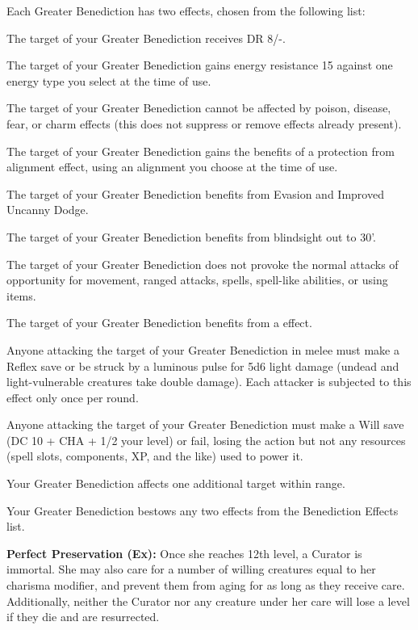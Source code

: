 Each Greater Benediction has two effects, chosen from the following list:
\begin{itemize*}
\item The target of your Greater Benediction receives DR 8/-.
\item The target of your Greater Benediction gains energy resistance 15 against one energy type you select at the time of use.
\item The target of your Greater Benediction cannot be affected by poison, disease, fear, or charm effects (this does not suppress or remove effects already present).
\item The target of your Greater Benediction gains the benefits of a protection from alignment effect, using an alignment you choose at the time of use.
\item The target of your Greater Benediction benefits from Evasion and Improved Uncanny Dodge.
\item The target of your Greater Benediction benefits from blindsight out to 30'.
\item The target of your Greater Benediction does not provoke the normal attacks of opportunity for movement, ranged attacks, spells, spell-like abilities, or using items.
\item The target of your Greater Benediction benefits from a  effect.
\item Anyone attacking the target of your Greater Benediction in melee must make a Reflex save or be struck by a luminous pulse for 5d6 light damage (undead and light-vulnerable creatures take double damage). Each attacker is subjected to this effect only once per round.
\item Anyone attacking the target of your Greater Benediction must make a Will save (DC 10 + CHA + 1/2 your level) or fail, losing the action but not any resources (spell slots, components, XP, and the like) used to power it.
\item Your Greater Benediction affects one additional target within range.
\item Your Greater Benediction bestows any two effects from the Benediction Effects list.
\end{itemize*}

\textbf{Perfect Preservation (Ex):} Once she reaches 12th level, a Curator is immortal. She may also care for a number of willing creatures equal to her charisma modifier, and prevent them from aging for as long as they receive care. Additionally, neither the Curator nor any creature under her care will lose a level if they die and are resurrected.


